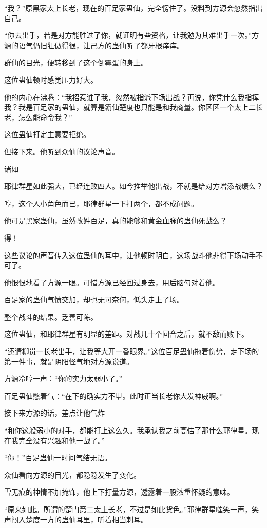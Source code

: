 \begin{this_body}
“我？”原黑家太上长老，现在的百足家蛊仙，完全愣住了。没料到方源会忽然指出自己。

“你去出手，若是对方能胜过了你，就证明有些资格，让我勉为其难出手一次。”方源的语气仍旧狂傲得很，让己方的蛊仙听了都牙根痒痒。

群仙的目光，便转移到了这个倒霉蛋的身上。

这位蛊仙顿时感觉压力好大。

他的内心在沸腾：“我招惹谁了我，忽然被指派下场出战？再说，你凭什么我指挥我？我是百足家的蛊仙，就算是霸仙楚度也只能是和我商量。你区区一个太上二长老，怎么能命令我？”

这位蛊仙打定主意要拒绝。

但接下来。他听到众仙的议论声音。

诸如

耶律群星如此强大，已经连败四人。如今推举他出战，不就是给对方增添战绩么？

哼，这个人小角色而已，耶律群星一下打两个，都不成问题。

他可是黑家蛊仙，虽然改姓百足，真的能够和黄金血脉的蛊仙死战么？

得！

这些议论的声音传入这位蛊仙的耳中，让他顿时明白，这场战斗他非得下场动手不可了。

他恨恨地看了方源一眼。可惜方源已经回过身去，用后脑勺对着他。

百足家的蛊仙气愤交加，却也无可奈何，低头走上了场。

整个战斗的结果。乏善可陈。

这位蛊仙，和耶律群星有明显的差距。对战几十个回合之后，就不敌而败下。

“还请柳贯一长老出手，让我等大开一番眼界。”这位百足蛊仙拖着伤势，走下场的第一件事，就是阴阳怪气地对方源说道。

方源冷哼一声：“你的实力太弱小了。”

百足蛊仙憋着气：“在下的确实力不堪。此时正当长老你大发神威啊。”

接下来方源的话，差点让他气炸

“和你这般弱小的对手，都能打上这么久。我承认我之前高估了那什么耶律星。现在我完全没有兴趣和他一战了。”

“你！”百足蛊仙一时间气结无语。

众仙看向方源的目光，都隐隐发生了变化。

雪无痕的神情不加掩饰，他上下打量方源，透露着一股浓重怀疑的意味。

“原来如此。所谓的楚门第二太上长老，不过是如此货色。”耶律群星嗤笑一声，笑声闯入楚度一方的蛊仙耳里，听着相当刺耳。


\end{this_body}
